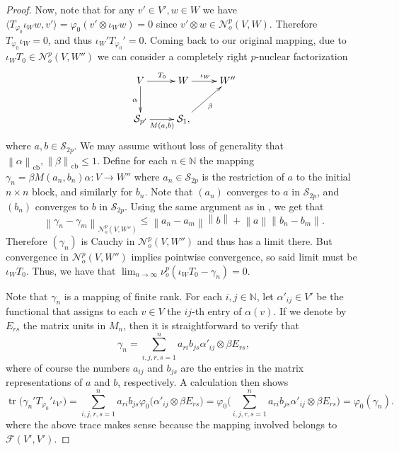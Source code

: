 \documentclass[11pt]{amsart}
\DeclareMathOperator{\cb}{cb}
\DeclareMathOperator{\tr}{tr}
\newcommand{\n}[1]{ \left\|#1\right\| }
\newcommand{\N}{{\mathbb{N}}}
\newcommand{\pair}[2]{{\langle #1, #2 \rangle}}
\numberwithin{equation}{section}
\begin{document}
\begin{proof}
Now, note that for any $v' \in V', w \in W$ we have 
$
\pair{T_{\varphi_0} \iota_Ww}{v'} = \varphi_0( v' \otimes \iota_Ww ) = 0
$
since $v' \otimes w \in \mathcal{N}^p_o(V,W)$.
Therefore $T_{\varphi_0}\iota_W = 0$, and thus $\iota_W'T_{\varphi_0}' = 0$.
Coming back to our original mapping, due to $\iota_WT_0 \in \mathcal{N}^p_o(V,W'')$ we can consider a completely right $p$-nuclear factorization
\[
\xymatrix{
V \ar[r]^{T_0} \ar[d]_{\alpha} &W \ar[r]^{\iota_W} &W''\\
\mathcal{S}_{p'} \ar[r]_{M(a,b)} &\mathcal{S}_1 \ar[ur]_{\beta}, 
}
\]
where $a,b\in \mathcal{S}_{2p}$. We may assume without loss of generality that $\n{\alpha}_{\cb}, \n{\beta}_{\cb} \le 1$.
Define for each $n\in\N$ the mapping $\gamma_n = \beta M(a_n,b_n)\alpha : V \to W''$ where $a_n \in \mathcal{S}_{2p}$ is the restriction of $a$ to the initial $n\times n$ block, and similarly for $b_n$.
Note that $(a_n)$ converges to $a$ in $\mathcal{S}_{2p}$, and  $(b_n)$ converges to $b$ in $\mathcal{S}_{2p}$.
Using the same argument as in \cite[Prop. 2.7]{ChaDiGa-Operator-p-compact}, we get that 
\[
\n{\gamma_n - \gamma_m}_{\mathcal{N}^p_o(V,W'')} \le \n{a_n -a_m} \n{b} + \n{a}\n{b_n-b_m}.
\]
Therefore $(\gamma_n)$ is Cauchy in $\mathcal{N}^p_o(V,W'')$ and thus has a limit there. But convergence in $\mathcal{N}^p_o(V,W'')$ implies pointwise convergence, so said limit must be $\iota_W T_0$. Thus, we have that $\lim_{n\to\infty}\nu^p_o( \iota_WT_0 - \gamma_n ) = 0$.

Note that $\gamma_n$ is a mapping of finite rank.
For each $i,j\in\N$, let $\alpha'_{ij} \in V'$ be the functional that assigns to each $v\in V$ the $ij$-th entry of $\alpha(v)$. If we denote by $E_{rs}$ the matrix units in $M_n$, then it is straightforward to verify that
\[
\gamma_n = \sum_{i,j,r,s=1}^n a_{ri}b_{js} \alpha'_{ij} \otimes \beta E_{rs},
\]
where of course the numbers $a_{ij}$ and $b_{js}$ are the entries in the matrix representations of $a$ and $b$, respectively.
A calculation then shows
\begin{equation}\label{eqn-Pietsch-trace-gamma_n}
\tr\big( \gamma_n' T_{\varphi_0}' \iota_{V'}\big) = \sum_{i,j,r,s=1}^n a_{ri}b_{js} \varphi_0\big(\alpha'_{ij} \otimes \beta E_{rs}\big) = \varphi_0\bigg( \sum_{i,j,r,s=1}^n a_{ri}b_{js} \alpha'_{ij} \otimes \beta E_{rs}\bigg) = \varphi_0(\gamma_n).
\end{equation}
where the above trace makes sense because the mapping involved belongs to $\mathcal{F}(V',V')$.



\end{proof}
\end{document}
